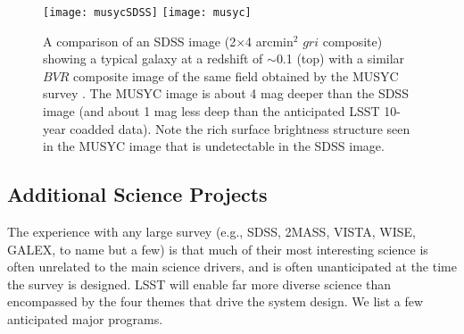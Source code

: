 \begin{figure}
\texttt{[image: musycSDSS]}
\texttt{[image: musyc]}
\caption{
A comparison of an SDSS image (2$\times$4 arcmin$^2$ $gri$ composite) showing a typical galaxy at
a redshift of $\sim$0.1 (top) with a similar $BVR$ composite image of the same field obtained by the MUSYC survey
\citep[bottom;][]{2006ApJS..162....1G}. The MUSYC image is about 4 mag deeper than the SDSS image (and about 1 mag less deep
than the anticipated LSST 10-year coadded data). Note the rich surface brightness structure seen in the MUSYC
image that is undetectable in the SDSS image.}
\label{Fig:musyc}
\end{figure}


\subsection{  Additional Science Projects}

The experience with any large survey (e.g., SDSS, 2MASS, VISTA, WISE, GALEX, to name but a
few) is that much of their most interesting science is often unrelated to
the main science drivers, and is often unanticipated at the time the survey is
designed. LSST will enable far more diverse science than encompassed by the
four themes that drive the system design. We list a few anticipated major
programs.

